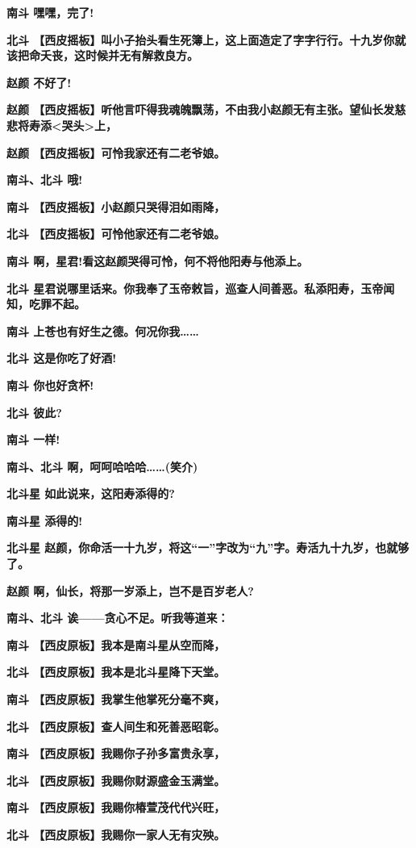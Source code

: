 \textbf{南斗 嘿嘿，完了!}

\textbf{北斗
【西皮摇板】叫小子抬头看生死簿上，这上面造定了字字行行。十九岁你就该把命夭丧，这时候并无有解救良方。}

\textbf{赵颜 不好了!}

\textbf{赵颜
【西皮摇板】听他言吓得我魂魄飘荡，不由我小赵颜无有主张。望仙长发慈悲将寿添\textless{}哭头\textgreater{}上，}

\textbf{赵颜 【西皮摇板】可怜我家还有二老爷娘。}

\textbf{南斗、北斗 哦!}

\textbf{南斗 【西皮摇板】小赵颜只哭得泪如雨降，}

\textbf{北斗 【西皮摇板】可怜他家还有二老爷娘。}

\textbf{南斗 啊，星君!看这赵颜哭得可怜，何不将他阳寿与他添上。}

\textbf{北斗
星君说哪里话来。你我奉了玉帝敕旨，巡查人间善恶。私添阳寿，玉帝闻知，吃罪不起。}

\textbf{南斗 上苍也有好生之德。何况你我\ldots{}\ldots{}}

\textbf{北斗 这是你吃了好酒!}

\textbf{南斗 你也好贪杯!}

\textbf{北斗 彼此?}

\textbf{南斗 一样!}

\textbf{南斗、北斗 啊，呵呵哈哈哈\ldots{}\ldots{}(笑介)}

\textbf{北斗星 如此说来，这阳寿添得的?}

\textbf{南斗星 添得的!}

\textbf{北斗星
赵颜，你命活一十九岁，将这``一''字改为``九''字。寿活九十九岁，也就够了。}

\textbf{赵颜 啊，仙长，将那一岁添上，岂不是百岁老人?}

\textbf{南斗、北斗 诶------贪心不足。听我等道来：}

\textbf{南斗 【西皮原板】我本是南斗星从空而降，}

\textbf{北斗 【西皮原板】我本是北斗星降下天堂。}

\textbf{南斗 【西皮原板】我掌生他掌死分毫不爽，}

\textbf{北斗 【西皮原板】查人间生和死善恶昭彰。}

\textbf{南斗 【西皮原板】我赐你子孙多富贵永享，}

\textbf{北斗 【西皮原板】我赐你财源盛金玉满堂。}

\textbf{南斗 【西皮原板】我赐你椿萱茂代代兴旺，}

\textbf{北斗 【西皮原板】我赐你一家人无有灾殃。}

